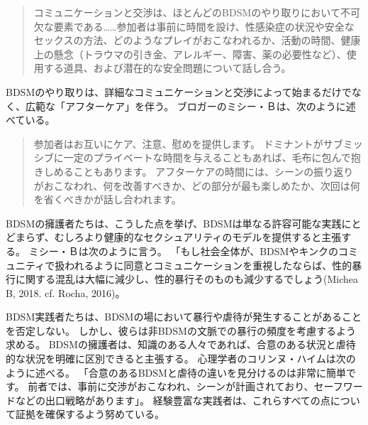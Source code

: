 \documentclass[paper=a4,book,openany]{jlreq}
\begin{document}
\begin{quote}
コミュニケーションと交渉は、ほとんどのBDSMのやり取りにおいて不可欠な要素である……参加者は事前に時間を設け、性感染症の状況や安全なセックスの方法、どのようなプレイがおこなわれるか、活動の時間、健康上の懸念（トラウマの引き金、アレルギー、障害、薬の必要性など）、使用する道具、および潜在的な安全問題について話し合う。
\citep[p.887]{kattari15:_gettin_it}

\end{quote}

BDSMのやり取りは、詳細なコミュニケーションと交渉によって始まるだけでなく、広範な「アフターケア」を伴う。
ブロガーのミシー・Ｂは、次のように述べている。

\begin{quote}
参加者はお互いにケア、注意、慰めを提供します。
ドミナントがサブミッシブに一定のプライベートな時間を与えることもあれば、毛布に包んで抱きしめることもあります。
アフターケアの時間には、シーンの振り返りがおこなわれ、何を改善すべきか、どの部分が最も楽しめたか、次回は何を省くべきかが話し合われます。
\citep{michea18:_can_bdsm_teach_us_what}
\end{quote}

BDSMの擁護者たちは、こうした点を挙げ、BDSMは単なる許容可能な実践にとどまらず、むしろより健康的なセクシュアリティのモデルを提供すると主張する。
ミシー・Ｂは次のように言う。
「もし社会全体が、BDSMやキンクのコミュニティで扱われるように同意とコミュニケーションを重視したならば、性的暴行に関する混乱は大幅に減少し、性的暴行そのものも減少するでしょう(Michea B, 2018. cf. Rocha, 2016)。
\nocite{rocha16:_aggres_hook_ups}

BDSM実践者たちは、BDSMの場において暴行や虐待が発生することがあることを否定しない。
しかし、彼らは非BDSMの文脈での暴行の頻度を考慮するよう求める。
BDSMの擁護者は、知識のある人々であれば、合意のある状況と虐待的な状況を明確に区別できると主張する。
心理学者のコリンヌ・ハイムは次のように述べる。
「合意のあるBDSMと虐待の違いを見分けるのは非常に簡単です。
前者では、事前に交渉がおこなわれ、シーンが計画されており、セーフワードなどの出口戦略があります」\citep{mcarthur16:_its_traves_that_bdsm_isnt_techn_legal}。
経験豊富な実践者は、これらすべての点について証拠を確保するよう努めている。
\end{document}
